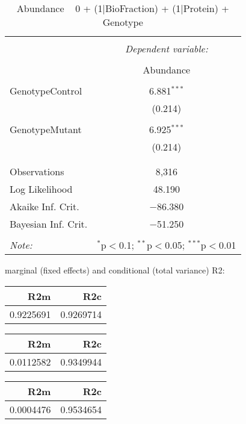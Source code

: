 \documentclass[11pt]{report}
\begin{document}
\begin{table}[!htbp] \centering 
  \caption{Abundance ~ 0 + (1|BioFraction) + (1|Protein) + Genotype} 
  \label{} 
\begin{tabular}{@{\extracolsep{5pt}}lc} 
\\[-1.8ex]\hline 
\hline \\[-1.8ex] 
 & \multicolumn{1}{c}{\textit{Dependent variable:}} \\ 
\cline{2-2} 
\\[-1.8ex] & Abundance \\ 
\hline \\[-1.8ex] 
 GenotypeControl & 6.881$^{***}$ \\ 
  & (0.214) \\ 
  & \\ 
 GenotypeMutant & 6.925$^{***}$ \\ 
  & (0.214) \\ 
  & \\ 
\hline \\[-1.8ex] 
Observations & 8,316 \\ 
Log Likelihood & 48.190 \\ 
Akaike Inf. Crit. & $-$86.380 \\ 
Bayesian Inf. Crit. & $-$51.250 \\ 
\hline 
\hline \\[-1.8ex] 
\textit{Note:}  & \multicolumn{1}{r}{$^{*}$p$<$0.1; $^{**}$p$<$0.05; $^{***}$p$<$0.01} \\ 
\end{tabular} 
\end{table} 
marginal (fixed effects) and conditional (total variance) R2:

\begin{tabular}{r|r}
\hline
R2m & R2c\\
\hline
0.9225691 & 0.9269714\\
\hline
\end{tabular}

\begin{tabular}{r|r}
\hline
R2m & R2c\\
\hline
0.0112582 & 0.9349944\\
\hline
\end{tabular}

\begin{tabular}{r|r}
\hline
R2m & R2c\\
\hline
0.0004476 & 0.9534654\\
\hline
\end{tabular}
\end{document}
